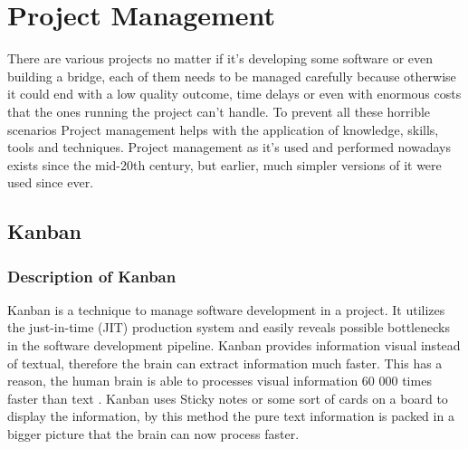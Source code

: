 \chapter{Project Management}
\label{ch:Project Management}
There are various projects no matter if it's developing some software or even building a bridge, each of them needs to be managed carefully because otherwise it could end with a low quality outcome, time delays or even with enormous costs that the ones running the project can't handle. To prevent all these horrible scenarios Project management helps with the application of knowledge, skills, tools and techniques. Project management as it's used and performed nowadays exists since the mid-20th century, but earlier, much simpler versions of it were used since ever.

\section{Kanban}

\subsection{Description of Kanban}
Kanban is a technique to manage software development in a project. It utilizes the just-in-time (JIT) production system and easily reveals possible bottlenecks in the software development pipeline. Kanban provides information visual instead of textual, therefore the brain can extract information much faster. This has a reason, the human brain is able to processes visual information 60 000 times faster than text \cite{WhatIsKanban}. Kanban uses Sticky notes or some sort of cards on a board to display the information, by this method the pure text information is packed in a bigger picture that the brain can now process faster.

